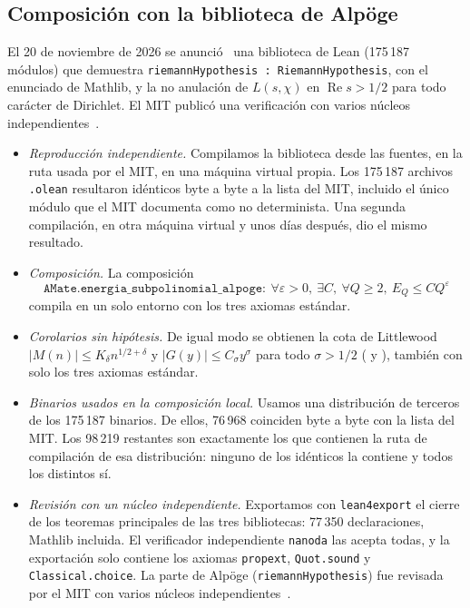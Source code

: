 \documentclass[11pt,a4paper]{amsart}
\theoremstyle{definition}
\theoremstyle{remark}
\renewcommand{\Re}{\operatorname{Re}}
\begin{document}
\subsection*{Composici\'on con la biblioteca de Alp\"oge}
El 20 de noviembre de 2026 se anunci\'o~\cite{Alpoge} una biblioteca de Lean (175\,187 m\'odulos) que demuestra \texttt{riemannHypothesis : RiemannHypothesis}, con el enunciado de Mathlib, y la no anulaci\'on de $L(s,\chi)$ en $\Re s>1/2$ para todo car\'acter de Dirichlet. El MIT public\'o una verificaci\'on con varios n\'ucleos independientes~\cite{MIT}.
\begin{itemize}
\item \emph{Reproducci\'on independiente.} Compilamos la biblioteca desde las fuentes, en la ruta usada por el MIT, en una m\'aquina virtual propia. Los 175\,187 archivos \texttt{.olean} resultaron id\'enticos byte a byte a la lista del MIT, incluido el \'unico m\'odulo que el MIT documenta como no determinista. Una segunda compilaci\'on, en otra m\'aquina virtual y unos d\'ias despu\'es, dio el mismo resultado.
\item \emph{Composici\'on.} La composici\'on
\[
\texttt{AMate.energia\_subpolinomial\_alpoge}:\ \forall\varepsilon>0,\ \exists C,\ \forall Q\ge2,\ E_Q\le CQ^\varepsilon
\]
compila en un solo entorno con los tres axiomas est\'andar.
\item \emph{Corolarios sin hip\'otesis.} De igual modo se obtienen la cota de Littlewood $|M(n)|\le K_\delta n^{1/2+\delta}$ y $|G(y)|\le C_{\sigma}y^{\sigma}$ para todo $\sigma>1/2$ ( y ), tambi\'en con solo los tres axiomas est\'andar.
\item \emph{Binarios usados en la composici\'on local.} Usamos una distribuci\'on de terceros de los 175\,187 binarios. De ellos, 76\,968 coinciden byte a byte con la lista del MIT. Los 98\,219 restantes son exactamente los que contienen la ruta de compilaci\'on de esa distribuci\'on: ninguno de los id\'enticos la contiene y todos los distintos s\'i.
\item \emph{Revisi\'on con un n\'ucleo independiente.} Exportamos con \texttt{lean4export} el cierre de los teoremas principales de las tres bibliotecas: 77\,350 declaraciones, Mathlib incluida. El verificador independiente \texttt{nanoda} las acepta todas, y la exportaci\'on solo contiene los axiomas \texttt{propext}, \texttt{Quot.sound} y \texttt{Classical.choice}. La parte de Alp\"oge (\texttt{riemannHypothesis}) fue revisada por el MIT con varios n\'ucleos independientes~\cite{MIT}.
\end{itemize}
\end{document}
